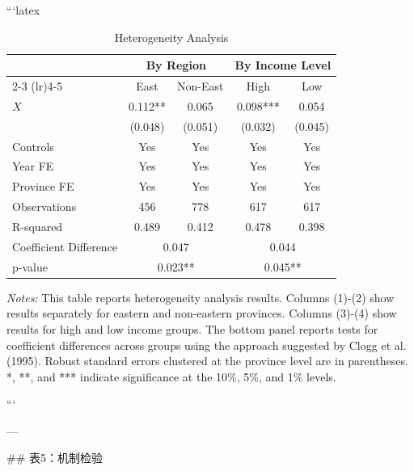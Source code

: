```latex
\begin{table}[htbp]
\centering
\caption{Heterogeneity Analysis}
\label{tab:heterogeneity}
\scriptsize
\begin{tabular}{lcccc}
\toprule
 & \multicolumn{2}{c}{By Region} & \multicolumn{2}{c}{By Income Level} \\
\cmidrule(lr){2-3} \cmidrule(lr){4-5}
 & East & Non-East & High & Low \\
\midrule
$X$ & 0.112** & 0.065 & 0.098*** & 0.054 \\
 & (0.048) & (0.051) & (0.032) & (0.045) \\
Controls & Yes & Yes & Yes & Yes \\
Year FE & Yes & Yes & Yes & Yes \\
Province FE & Yes & Yes & Yes & Yes \\
\midrule
Observations & 456 & 778 & 617 & 617 \\
R-squared & 0.489 & 0.412 & 0.478 & 0.398 \\
\midrule
Coefficient Difference & \multicolumn{2}{c}{0.047} & \multicolumn{2}{c}{0.044} \\
p-value & \multicolumn{2}{c}{0.023**} & \multicolumn{2}{c}{0.045**} \\
\bottomrule
\end{tabular}
\begin{minipage}{\linewidth}
\smallskip
\textit{Notes:} This table reports heterogeneity analysis results. Columns (1)-(2) show results separately for eastern and non-eastern provinces. Columns (3)-(4) show results for high and low income groups. The bottom panel reports tests for coefficient differences across groups using the approach suggested by Clogg et al. (1995). Robust standard errors clustered at the province level are in parentheses. *, **, and *** indicate significance at the 10\%, 5\%, and 1\% levels.
\end{minipage}
\end{table}
```

---

## 表5：机制检验

